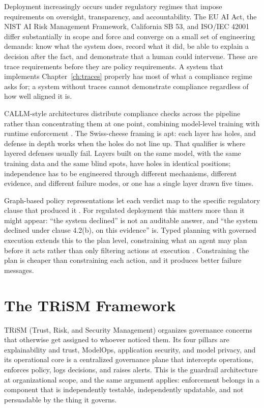 \documentclass[11pt]{book}
\begin{document}
Deployment increasingly occurs under regulatory regimes that impose requirements on oversight, transparency, and accountability. The EU AI Act, the NIST AI Risk Management Framework, California SB 53, and ISO/IEC 42001 differ substantially in scope and force and converge on a small set of engineering demands: know what the system does, record what it did, be able to explain a decision after the fact, and demonstrate that a human could intervene. These are trace requirements before they are policy requirements. A system that implements Chapter~\ref{ch:traces} properly has most of what a compliance regime asks for; a system without traces cannot demonstrate compliance regardless of how well aligned it is.

CALLM-style architectures distribute compliance checks across the pipeline rather than concentrating them at one point, combining model-level training with runtime enforcement \cite{callm2025}. The Swiss-cheese framing is apt: each layer has holes, and defense in depth works when the holes do not line up. That qualifier is where layered defenses usually fail. Layers built on the same model, with the same training data and the same blind spots, have holes in identical positions; independence has to be engineered through different mechanisms, different evidence, and different failure modes, or one has a single layer drawn five times.

Graph-based policy representations let each verdict map to the specific regulatory clause that produced it \cite{graphcompliance2025}. For regulated deployment this matters more than it might appear: ``the system declined'' is not an auditable answer, and ``the system declined under clause 4.2(b), on this evidence'' is. Typed planning with governed execution extends this to the plan level, constraining what an agent may plan before it acts rather than only filtering actions at execution \cite{polaris2026}. Constraining the plan is cheaper than constraining each action, and it produces better failure messages.

\section{The TRiSM Framework}

TRiSM (Trust, Risk, and Security Management) organizes governance concerns that otherwise get assigned to whoever noticed them. Its four pillars are explainability and trust, ModelOps, application security, and model privacy, and its operational core is a centralized governance plane that intercepts operations, enforces policy, logs decisions, and raises alerts. This is the guardrail architecture at organizational scope, and the same argument applies: enforcement belongs in a component that is independently testable, independently updatable, and not persuadable by the thing it governs.
\end{document}

